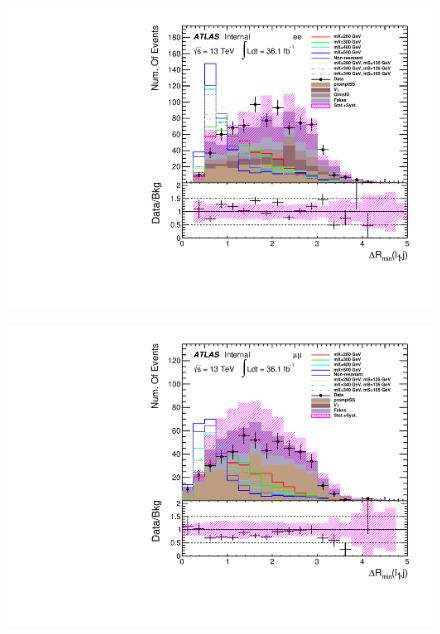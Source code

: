 \begin{figure}[h]
\begin{minipage}[t]{0.33\linewidth}
 \centering
 \includegraphics[width=1.0\textwidth]{fig/dataMC_low_Njet_CR/mindR_l1j_ee.pdf}\label{fig:dataMC_low_Njet_CR:mindRl1j_ee.pdf}
 \end{minipage}
 \begin{minipage}[t]{0.33\linewidth}
 \centering
 \includegraphics[width=1.0\textwidth]{fig/dataMC_low_Njet_CR/mindR_l1j_mumu.pdf}\label{fig:dataMC_low_Njet_CR:mindRl1j_mumu.pdf}
 \end{minipage}
 \begin{minipage}[t]{0.33\linewidth}
 \centering

\end{minipage}
\end{figure}
